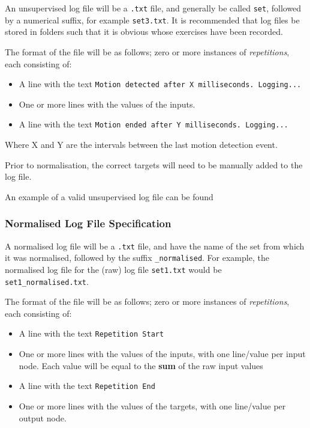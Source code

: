\documentclass[a4paper]{article}
\begin{document}
An unsupervised log file will be a \lstinline{.txt} file, and generally be called \lstinline{set}, followed by a numerical suffix, for example \lstinline{set3.txt}. It is recommended that log files be stored in folders such that it is obvious whose exercises have been recorded.

The format of the file will be as follows; zero or more instances of \emph{repetitions}, each consisting of:

\begin{itemize}
\item A line with the text \lstinline{Motion detected after X milliseconds. Logging...}
\item One or more lines with the values of the inputs.
\item A line with the text \lstinline{Motion ended after Y milliseconds. Logging...}
\end{itemize}

Where X and Y are the intervals between the last motion detection event.

Prior to normalisation, the correct targets will need to be manually added to the log file.

An example of a valid unsupervised log file can be found 

\subsubsection{Normalised Log File Specification}

A normalised log file will be a \lstinline{.txt} file, and have the name of the set from which it was normalised, followed by the suffix \lstinline{_normalised}. For example, the normalised log file for the (raw) log file \lstinline{set1.txt} would be \lstinline{set1_normalised.txt}.

The format of the file will be as follows; zero or more instances of \emph{repetitions}, each consisting of:
\begin{itemize}
\item A line with the text \lstinline{Repetition Start}
\item One or more lines with the values of the inputs, with one line/value per input node. Each value will be equal to the \textbf{sum} of the raw input values
\item A line with the text \lstinline{Repetition End}
\item One or more lines with the values of the targets, with one line/value per output node.
\end{itemize}
\end{document}
